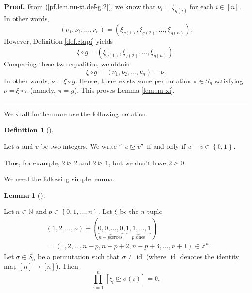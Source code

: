 \documentclass
[numbers=enddot,12pt,final,onecolumn,notitlepage,english]{scrartcl}%
\theoremstyle{definition}
\newtheorem{lem}[theo]{Lemma}
\newenvironment{lemma}[1][]
{\begin{lem}[#1]\begin{leftbar}}
{\end{leftbar}\end{lem}}
\newtheorem{defi}[theo]{Definition}
\newenvironment{definition}[1][]
{\begin{defi}[#1]\begin{leftbar}}
{\end{leftbar}\end{defi}}
\newenvironment{proof}[1][Proof]{\noindent\textbf{#1.} }{\ \rule{0.5em}{0.5em}}
\let\prodnonlimits\prod
\renewcommand{\prod}{\prodnonlimits\limits}
\newenvironment{verlong}{}{}
\begin{document}
\begin{verlong}
\begin{proof}
From (\ref{pf.lem.nu-xi.def-g.2}), we know that $\nu_{i}=\xi_{g\left(
i\right)  }$ for each $i\in\left[  n\right]  $. In other words,%
\[
\left(  \nu_{1},\nu_{2},\ldots,\nu_{n}\right)  =\left(  \xi_{g\left(
1\right)  },\xi_{g\left(  2\right)  },\ldots,\xi_{g\left(  n\right)  }\right)
.
\]
However, Definition \ref{def.etapi} yields%
\[
\xi\circ g=\left(  \xi_{g\left(  1\right)  },\xi_{g\left(  2\right)  }%
,\ldots,\xi_{g\left(  n\right)  }\right)  .
\]
Comparing these two equalities, we obtain%
\[
\xi\circ g=\left(  \nu_{1},\nu_{2},\ldots,\nu_{n}\right)  =\nu.
\]
In other words, $\nu=\xi\circ g$. Hence, there exists some permutation $\pi\in
S_{n}$ satisfying $\nu=\xi\circ\pi$ (namely, $\pi=g$). This proves Lemma
\ref{lem.nu-xi}.
\end{proof}
\end{verlong}

We shall furthermore use the following notation:

\begin{definition}
\label{def.cover01}Let $u$ and $v$ be two integers. We write \textquotedblleft%
$u\trianglerighteq v$\textquotedblright\ if and only if $u-v\in\left\{
0,1\right\}  $.
\end{definition}

Thus, for example, $2\trianglerighteq2$ and $2\trianglerighteq1$, but we don't
have $2\trianglerighteq0$.

We need the following simple lemma:

\begin{lemma}
\label{lem.xi-unique}Let $n\in\mathbb{N}$ and $p\in\left\{  0,1,\ldots
,n\right\}  $. Let $\xi$ be the $n$-tuple
\begin{align*}
&  \left(  1,2,\ldots,n\right)  +\left(  \underbrace{0,0,\ldots,0}_{n-p\text{
zeroes}},\underbrace{1,1,\ldots,1}_{p\text{ ones}}\right) \\
&  =\left(  1,2,\ldots,n-p,n-p+2,n-p+3,\ldots,n+1\right)  \in\mathbb{Z}^{n}.
\end{align*}
Let $\sigma\in S_{n}$ be a permutation such that $\sigma\neq\operatorname*{id}%
$ (where $\operatorname*{id}$ denotes the identity map $\left[  n\right]
\rightarrow\left[  n\right]  $). Then,%
\[
\prod_{i=1}^{n}\left[  \xi_{i}\trianglerighteq\sigma\left(  i\right)  \right]
=0.
\]

\end{lemma}
\end{document}
